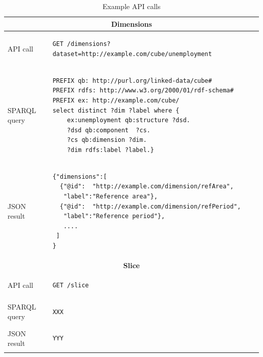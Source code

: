 \documentclass{llncs}
\begin{document}
\begin{table}
\caption{Example API calls}
\begin{tabular}{|l|l|}
\hline
\multicolumn{2}{|c|}{\textbf{Dimensions}}\\

\hline
API call &
\begin{minipage}[t]{4.5in}
 \begin{verbatim} 
GET /dimensions?dataset=http://example.com/cube/unemployment         
\end{verbatim}
\end{minipage}\\\hline

SPARQL query  &
\begin{minipage}[t]{4.5in}
 \begin{verbatim} 
PREFIX qb: http://purl.org/linked-data/cube#
PREFIX rdfs: http://www.w3.org/2000/01/rdf-schema#
PREFIX ex: http://example.com/cube/
select distinct ?dim ?label where {
    ex:unemployment qb:structure ?dsd.
    ?dsd qb:component  ?cs.
    ?cs qb:dimension ?dim.
    ?dim rdfs:label ?label.} 
\end{verbatim}
\end{minipage}\\ \hline

JSON result &
\begin{minipage}[t]{4.5in}
 \begin{verbatim} 
{"dimensions":[
  {"@id":  "http://example.com/dimension/refArea",
   "label":"Reference area"},
  {"@id":  "http://example.com/dimension/refPeriod",
   "label":"Reference period"},
   ....
 ]
}  
\end{verbatim}
\end{minipage}\\\hline

\multicolumn{2}{|c|}{\textbf{Slice}}\\

\hline
API call &
\begin{minipage}[t]{4.5in}
 \begin{verbatim} 
GET /slice
\end{verbatim}
\end{minipage}\\\hline

SPARQL query  &
\begin{minipage}[t]{4.5in}
 \begin{verbatim} 
XXX
\end{verbatim}
\end{minipage}\\ \hline

JSON result &
\begin{minipage}[t]{4.5in}
 \begin{verbatim} 
YYY 
\end{verbatim}
\end{minipage}\\\hline


\end{tabular}
\label{tbl:apiexamplecall}
\end{table}
\end{document}
